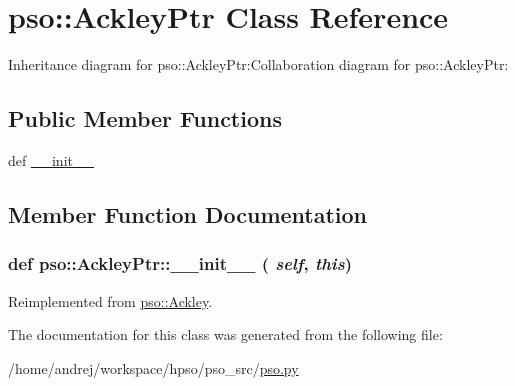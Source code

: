 \hypertarget{classpso_1_1AckleyPtr}{
\section{pso::AckleyPtr Class Reference}
\label{classpso_1_1AckleyPtr}
}
Inheritance diagram for pso::AckleyPtr:Collaboration diagram for pso::AckleyPtr:\subsection*{Public Member Functions}
\begin{CompactItemize}
\item 
def \hyperlink{classpso_1_1AckleyPtr_92267323798f30fea8a7d1e807261dc3}{\_\-\_\-init\_\-\_\-}
\end{CompactItemize}


\subsection{Member Function Documentation}
\hypertarget{classpso_1_1AckleyPtr_92267323798f30fea8a7d1e807261dc3}{
\subsubsection{\setlength{\rightskip}{0pt plus 5cm}def pso::AckleyPtr::\_\-\_\-init\_\-\_\- ( {\em self}, \/   {\em this})}}
\label{classpso_1_1AckleyPtr_92267323798f30fea8a7d1e807261dc3}




Reimplemented from \hyperlink{classpso_1_1Ackley_df19f3468a7b5b260adffcd134145e24}{pso::Ackley}.

The documentation for this class was generated from the following file:\begin{CompactItemize}
\item 
/home/andrej/workspace/hpso/pso\_\-src/\hyperlink{pso_8py}{pso.py}\end{CompactItemize}

